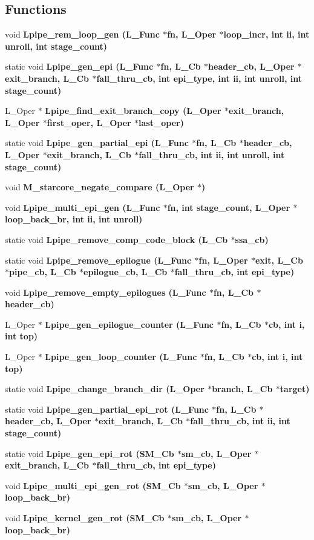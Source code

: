 \subsection*{Functions}
\begin{CompactItemize}
\item 
void \bf{Lpipe\_\-rem\_\-loop\_\-gen} (L\_\-Func $\ast$fn, L\_\-Oper $\ast$loop\_\-incr, int ii, int unroll, int stage\_\-count)
\item 
static void \bf{Lpipe\_\-gen\_\-epi} (L\_\-Func $\ast$fn, L\_\-Cb $\ast$\bf{header\_\-cb}, L\_\-Oper $\ast$exit\_\-branch, L\_\-Cb $\ast$fall\_\-thru\_\-cb, int epi\_\-type, int ii, int unroll, int stage\_\-count)
\item 
L\_\-Oper $\ast$ \bf{Lpipe\_\-find\_\-exit\_\-branch\_\-copy} (L\_\-Oper $\ast$exit\_\-branch, L\_\-Oper $\ast$first\_\-oper, L\_\-Oper $\ast$last\_\-oper)
\item 
static void \bf{Lpipe\_\-gen\_\-partial\_\-epi} (L\_\-Func $\ast$fn, L\_\-Cb $\ast$\bf{header\_\-cb}, L\_\-Oper $\ast$exit\_\-branch, L\_\-Cb $\ast$fall\_\-thru\_\-cb, int ii, int unroll, int stage\_\-count)
\item 
void \bf{M\_\-starcore\_\-negate\_\-compare} (L\_\-Oper $\ast$)
\item 
void \bf{Lpipe\_\-multi\_\-epi\_\-gen} (L\_\-Func $\ast$fn, int stage\_\-count, L\_\-Oper $\ast$loop\_\-back\_\-br, int ii, int unroll)
\item 
static void \bf{Lpipe\_\-remove\_\-comp\_\-code\_\-block} (L\_\-Cb $\ast$ssa\_\-cb)
\item 
static void \bf{Lpipe\_\-remove\_\-epilogue} (L\_\-Func $\ast$fn, L\_\-Oper $\ast$exit, L\_\-Cb $\ast$pipe\_\-cb, L\_\-Cb $\ast$epilogue\_\-cb, L\_\-Cb $\ast$fall\_\-thru\_\-cb, int epi\_\-type)
\item 
void \bf{Lpipe\_\-remove\_\-empty\_\-epilogues} (L\_\-Func $\ast$fn, L\_\-Cb $\ast$\bf{header\_\-cb})
\item 
L\_\-Oper $\ast$ \bf{Lpipe\_\-gen\_\-epilogue\_\-counter} (L\_\-Func $\ast$fn, L\_\-Cb $\ast$cb, int i, int top)
\item 
L\_\-Oper $\ast$ \bf{Lpipe\_\-gen\_\-loop\_\-counter} (L\_\-Func $\ast$fn, L\_\-Cb $\ast$cb, int i, int top)
\item 
static void \bf{Lpipe\_\-change\_\-branch\_\-dir} (L\_\-Oper $\ast$branch, L\_\-Cb $\ast$target)
\item 
static void \bf{Lpipe\_\-gen\_\-partial\_\-epi\_\-rot} (L\_\-Func $\ast$fn, L\_\-Cb $\ast$\bf{header\_\-cb}, L\_\-Oper $\ast$exit\_\-branch, L\_\-Cb $\ast$fall\_\-thru\_\-cb, int ii, int stage\_\-count)
\item 
static void \bf{Lpipe\_\-gen\_\-epi\_\-rot} (\bf{SM\_\-Cb} $\ast$sm\_\-cb, L\_\-Oper $\ast$exit\_\-branch, L\_\-Cb $\ast$fall\_\-thru\_\-cb, int epi\_\-type)
\item 
void \bf{Lpipe\_\-multi\_\-epi\_\-gen\_\-rot} (\bf{SM\_\-Cb} $\ast$sm\_\-cb, L\_\-Oper $\ast$loop\_\-back\_\-br)
\item 
void \bf{Lpipe\_\-kernel\_\-gen\_\-rot} (\bf{SM\_\-Cb} $\ast$sm\_\-cb, L\_\-Oper $\ast$loop\_\-back\_\-br)
\end{CompactItemize}


